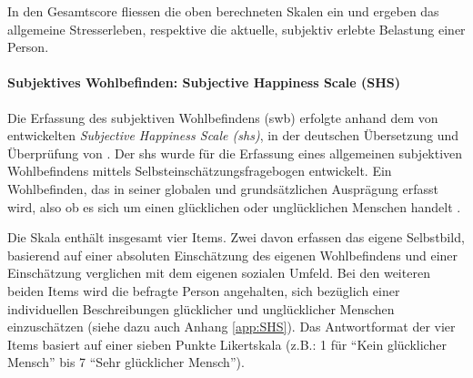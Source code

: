 In den Gesamtscore fliessen die oben berechneten Skalen ein und ergeben das allgemeine Stresserleben, respektive die aktuelle, subjektiv erlebte Belastung einer Person.

\paragraph{Subjektives Wohlbefinden: Subjective Happiness Scale (SHS)}\label{sec:SWB}
Die Erfassung des subjektiven Wohlbefindens (\acrshort{swb}) erfolgte anhand dem von  entwickelten \textit{Subjective Happiness Scale (\acrshort{shs})}, in der deutschen Übersetzung und Überprüfung von . Der \acrshort{shs} wurde für die Erfassung  eines allgemeinen subjektiven Wohlbefindens mittels Selbsteinschätzungsfragebogen entwickelt. Ein Wohlbefinden, das in seiner globalen und grundsätzlichen Ausprägung erfasst wird, also ob es sich um einen glücklichen oder unglücklichen Menschen handelt  \cite[S.~139ff]{Lyubomirsky1999}.

Die Skala enthält insgesamt vier Items. Zwei davon erfassen das eigene Selbstbild, basierend auf einer absoluten Einschätzung des eigenen Wohlbefindens und einer Einschätzung verglichen mit dem eigenen sozialen Umfeld. Bei den weiteren beiden Items wird die befragte Person angehalten, sich bezüglich einer individuellen Beschreibungen glücklicher und unglücklicher Menschen einzuschätzen (siehe dazu auch Anhang \ref{app:SHS}). Das Antwortformat der vier Items basiert auf einer sieben Punkte Likertskala (z.B.: 1 für \enquote{Kein glücklicher Mensch} bis 7 \enquote{Sehr glücklicher Mensch}). 

